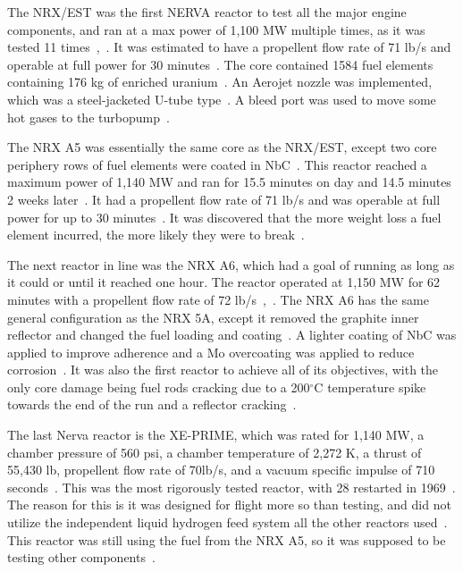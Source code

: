 \documentclass{article}
\begin{document}
The NRX/EST was the first NERVA reactor to test all the major engine components, and ran at a max power of 1,100 MW multiple times, as it was tested 11 times~\cite{finseth1991rover},~\cite{gerrish2014nuclear}. It was estimated to have a propellent flow rate of 71 lb/s and operable at full power for 30 minutes~\cite{ledbetter1969nerva}. The core contained 1584 fuel elements containing 176 kg of enriched uranium~\cite{finseth1991rover}. An Aerojet nozzle was implemented, which was a steel-jacketed U-tube type~\cite{finseth1991rover}. A bleed port was used to move some hot gases to the turbopump~\cite{finseth1991rover}.


The NRX A5 was essentially the same core as the NRX/EST, except two core periphery rows of fuel elements were coated in NbC~\cite{finseth1991rover}. This reactor reached a maximum power of 1,140 MW and ran for 15.5 minutes on day and 14.5 minutes 2 weeks later~\cite{gerrish2014nuclear}. It had a propellent flow rate of 71 lb/s and was operable at full power for up to 30 minutes~\cite{ledbetter1969nerva}. It was discovered that the more weight loss a fuel element incurred, the more likely they were to break~\cite{finseth1991rover}.


The next reactor in line was the NRX A6, which had a goal of running as long as it could or until it reached one hour. The reactor operated at 1,150 MW for 62 minutes with a propellent flow rate of 72 lb/s~\cite{gerrish2014nuclear},~\cite{ledbetter1969nerva}. The NRX A6 has the same general configuration as the NRX 5A, except it removed the graphite inner reflector and changed the fuel loading and coating~\cite{finseth1991rover}. A lighter coating of NbC was applied to improve adherence and a Mo overcoating was applied to reduce corrosion~\cite{finseth1991rover}. It was also the first reactor to achieve all of its objectives, with the only core damage being fuel rods cracking due to a 200$^{\circ}$C temperature spike towards the end of the run and a reflector cracking~\cite{finseth1991rover}.


The last Nerva reactor is the XE-PRIME, which was rated for 1,140 MW, a chamber pressure of 560 psi, a chamber temperature of 2,272 K, a thrust of 55,430 lb, propellent flow rate of 70lb/s, and a vacuum specific impulse of 710 seconds~\cite{finseth1991rover}. This was the most rigorously tested reactor, with 28 restarted in 1969~\cite{gerrish2014nuclear}. The reason for this is it was designed for flight more so than testing, and did not utilize the independent liquid hydrogen feed system all the other reactors used~\cite{finseth1991rover}. This reactor was still using the fuel from the NRX A5, so it was supposed to be testing other components~\cite{gerrish2014nuclear}.
\end{document}
